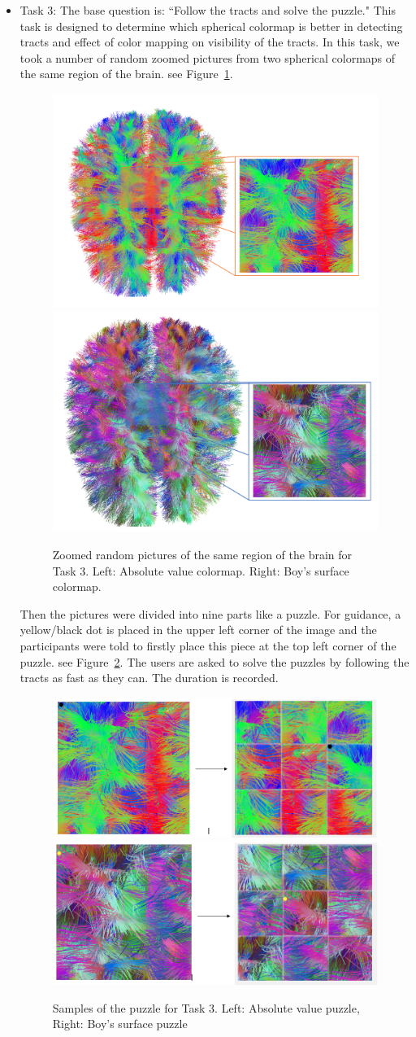 \documentclass[hyperref, plainreport, noproblem]{cgvpub1}
\begin{document}
\begin{itemize}
\item{Task 3:} The base question is: ``Follow the tracts and solve the puzzle."
This task is designed to determine which spherical colormap is better in detecting tracts and effect of color mapping on visibility of the tracts. In this task, we took a number of random zoomed pictures from two spherical colormaps of the same region of the brain. see Figure~\ref{fig:absolute-zoomed}.

\begin{figure}[ht]
    \centering
    \includegraphics[width = 0.49 \columnwidth]{absolute-zoomed}
    \includegraphics[width = 0.45 \columnwidth]{boy's-zoomed}
    \caption{Zoomed random pictures of the same region of the brain for Task 3. Left:  Absolute value colormap. Right: Boy's surface colormap.}
    \label{fig:absolute-zoomed}
\end{figure}

Then the pictures were divided into nine parts like a puzzle. For guidance, a yellow/black dot is placed in the upper left corner of the image and the participants were told to firstly place this piece at the top left corner of the puzzle. see Figure~\ref{fig:absolute-puzzle}. The users are asked to solve the puzzles by following the tracts as fast as they can. The duration is recorded. 

\begin{figure}[ht]
    \centering
    \includegraphics[width = 0.49 \columnwidth]{absolute-puzzle}
    \includegraphics[width = 0.48 \columnwidth]{boy's-puzzle}
    \caption{ Samples of the puzzle for Task 3. Left:  Absolute value puzzle, Right: Boy's surface puzzle}
    \label{fig:absolute-puzzle}
\end{figure}


\end{itemize}
\end{document}

